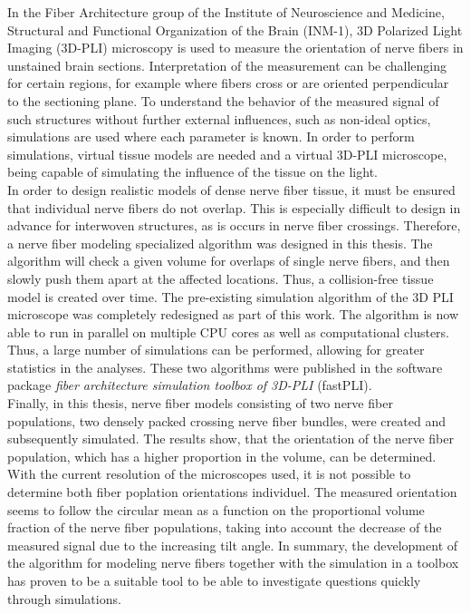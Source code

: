 %
In the Fiber Architecture group of the Institute of Neuroscience and Medicine, Structural and Functional Organization of the Brain (INM-1), 3D Polarized Light Imaging (3D-PLI) microscopy is used to measure the orientation of nerve fibers in unstained brain sections.
Interpretation of the measurement can be challenging for certain regions, for example where fibers cross or are oriented perpendicular to the sectioning plane.
To understand the behavior of the measured signal of such structures without further external influences, such as non-ideal optics, simulations are used where each parameter is known.
In order to perform simulations, virtual tissue models are needed and a virtual 3D-PLI microscope, being capable of simulating the influence of the tissue on the light.
\\
%
In order to design realistic models of dense nerve fiber tissue, it must be ensured that individual nerve fibers do not overlap.
This is especially difficult to design in advance for interwoven structures, as is occurs in nerve fiber crossings.
Therefore, a nerve fiber modeling specialized algorithm was designed in this thesis.
The algorithm will check a given volume for overlaps of single nerve fibers, and then slowly push them apart at the affected locations.
Thus, a collision-free tissue model is created over time.
The pre-existing simulation algorithm of the 3D PLI microscope was completely redesigned as part of this work.
The algorithm is now able to run in parallel on multiple CPU cores as well as computational clusters.
Thus, a large number of simulations can be performed, allowing for greater statistics in the analyses.
These two algorithms were published in the software package \textit{fiber architecture simulation toolbox of 3D-PLI} (fastPLI).
\\
%
Finally, in this thesis, nerve fiber models consisting of two nerve fiber populations, \ie{} two densely packed crossing nerve fiber bundles, were created and subsequently simulated.
The results show, that the orientation of the nerve fiber population, which has a higher proportion in the volume, can be determined.
With the current resolution of the microscopes used, it is not possible to determine both fiber poplation orientations individuel.
The measured orientation seems to follow the circular mean as a function on the proportional volume fraction of the nerve fiber populations, taking into account the decrease of the measured signal due to the increasing tilt angle.
In summary, the development of the algorithm for modeling nerve fibers together with the simulation in a toolbox has proven to be a suitable tool to be able to investigate questions quickly through simulations.

